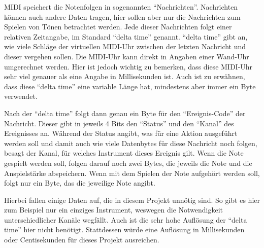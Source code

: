 \ac{MIDI} speichert die Notenfolgen in sogenannten \enquote{Nachrichten}.
Nachrichten können auch andere Daten tragen, hier sollen aber nur die Nachrichten zum Spielen von Tönen betrachtet werden.
Jede dieser Nachrichten folgt einer relativen Zeitangabe, im Standard \enquote{delta time} genannt.
\enquote{delta time} gibt an, wie viele Schläge der virtuellen \ac{MIDI}-Uhr zwischen der letzten Nachricht und dieser vergehen sollen.
Die \ac{MIDI}-Uhr kann direkt in Angaben einer Wand-Uhr umgerechnet werden.
Hier ist jedoch wichtig zu bemerken, dass diese \ac{MIDI}-Uhr sehr viel genauer als eine Angabe in Millisekunden ist.
Auch ist zu erwähnen, dass diese \enquote{delta time} eine variable Länge hat, mindestens aber immer ein Byte verwendet.

Nach der \enquote{delta time} folgt dann genau ein Byte für den \enquote{Ereignis-Code} der Nachricht.
Dieser gibt in jeweils 4 Bits den \enquote{Status} und den \enquote{Kanal} des Ereignisses an.
Während der Status angibt, was für eine Aktion ausgeführt werden soll und damit auch wie viele Datenbytes für diese Nachricht noch folgen, besagt der Kanal, für welches Instrument dieses Ereignis gilt.
Wenn die Note gespielt werden soll, folgen darauf noch zwei Bytes, die jeweils die Note und die Anspielstärke abspeichern.
Wenn mit dem Spielen der Note aufgehört werden soll, folgt nur ein Byte, das die jeweilige Note angibt.

Hierbei fallen einige Daten auf, die in diesem Projekt unnötig sind.
So gibt es hier zum Beispiel nur ein einziges Instrument, weswegen die Notwendigkeit unterschiedlicher Kanäle wegfällt.
Auch ist die sehr hohe Auflösung der \enquote{delta time} hier nicht benötigt.
Stattdessen würde eine Auflösung in Millisekunden oder Centisekunden für dieses Projekt ausreichen.

